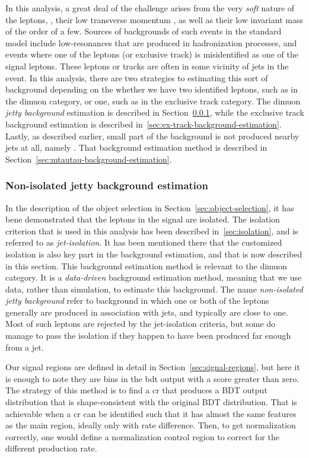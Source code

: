 In this analysis, a great deal of the challenge arises from the very \emph{soft} nature of the leptons, \ie, their low transverse momentum \pt, as well as their low invariant mass of the order of a few\GeV. Sources of backgrounds of such events in the standard model include low-\pt resonances that are produced in hadronization processes, and events where one of the leptons (or exclusive track) is misidentified as one of the signal leptons. These leptons or tracks are often in some vicinity of jets in the event. In this analysis, there are two strategies to estimating this sort of background depending on the whether we have two identified leptons, such as in the dimuon category, or one, such as in the exclusive track category. The dimuon \emph{jetty background} estimation is described in Section~\ref{sec:jetty-background-estimation}, while the exclusive track background estimation is described in~\ref{sec:ex-track-background-estimation}. Lastly, as described earlier, small part of the background is not produced nearby jets at all, namely \ztautau. That background estimation method is described in Section~\ref{sec:mtautau-background-estimation}.

\clearpage
\subsubsection{Non-isolated jetty background estimation}
\label{sec:jetty-background-estimation}

In the description of the object selection in Section~\ref{sec:object-selection}, it has bene demonstrated that the leptons in the signal are isolated. The isolation criterion that is used in this analysis has been described in~\ref{sec:isolation}, and is referred to as \emph{jet-isolation}. It has been mentioned there that the customized isolation is also key part in the background estimation, and that is now described in this section. This background estimation method is relevant to the dimuon category. It is a \emph{data-driven} background estimation method, meaning that we use data, rather than simulation, to estimate this background. The name \emph{non-isolated jetty background} refer to background in which one or both of the leptons generally are produced in association with jets, and typically are close to one. Most of such leptons are rejected by the jet-isolation criteria, but some do manage to pass the isolation if they happen to have been produced far enough from a jet. 

Our signal regions are defined in detail in Section~\ref{sec:signal-regions}, but here it is enough to note they are bins in the \gls{bdt} output with a score greater than zero. The strategy of this method is to find a \gls{cr} that produces a BDT output distribution that is shape-consistent with the original BDT distribution. That is achievable when a \gls{cr} can be identified such that it has almost the same features as the main region, ideally only with rate difference. Then, to get normalization correctly, one would define a normalization control region to correct for the different production rate.


